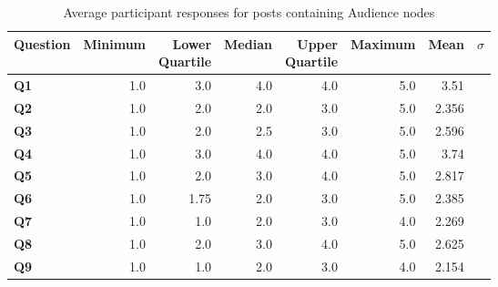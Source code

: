 \begin{table}
\centering
\caption{Average participant responses for posts containing Audience nodes}
\label{table:perception:audience-average}
\begin{tabular}{ l | r | r | r | r | r | r | r}
\textbf{Question} & \textbf{Minimum} & \pbox{2cm}{\textbf{Lower}\\ \textbf{Quartile}} & \textbf{Median} & \pbox{2cm}{\textbf{Upper}\\ \textbf{Quartile}} & \textbf{Maximum} & \textbf{Mean} & \textbf{$\sigma$}\\
\hline
\textbf{Q1} &  1.0 & 3.0 & 4.0 & 4.0 & 5.0 & 3.51 &  \\
\hline
\textbf{Q2} &  1.0 & 2.0 & 2.0 & 3.0 & 5.0 & 2.356 &  \\
\hline
\textbf{Q3} &  1.0 & 2.0 & 2.5 & 3.0 & 5.0 & 2.596 &  \\
\hline
\textbf{Q4} &  1.0 & 3.0 & 4.0 & 4.0 & 5.0 & 3.74 &  \\
\hline
\textbf{Q5} &  1.0 & 2.0 & 3.0 & 4.0 & 5.0 & 2.817 &  \\
\hline
\textbf{Q6} &  1.0 & 1.75 & 2.0 & 3.0 & 5.0 & 2.385 &  \\
\hline
\textbf{Q7} &  1.0 & 1.0 & 2.0 & 3.0 & 4.0 & 2.269 &  \\
\hline
\textbf{Q8} &  1.0 & 2.0 & 3.0 & 4.0 & 5.0 & 2.625 &  \\
\hline
\textbf{Q9} &  1.0 & 1.0 & 2.0 & 3.0 & 4.0 & 2.154 &  \\
\end{tabular}
\end{table}




